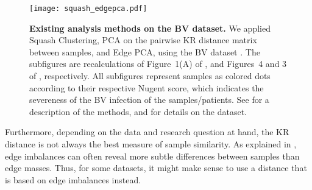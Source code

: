 \begin{figure}[!htb]
    \centering
    \texttt{[image: squash\_edgepca.pdf]}
    \begin{subfigure}{0pt}
        \label{fig:squash_edgepca:sub:squash}
    \end{subfigure}
    \begin{subfigure}{0pt}
        \label{fig:squash_edgepca:sub:pca}
    \end{subfigure}
    \begin{subfigure}{0pt}
        \label{fig:squash_edgepca:sub:epca}
    \end{subfigure}
    \caption[Existing analysis methods on the BV dataset]{
        \textbf{Existing analysis methods on the BV dataset.}
        We applied  Squash Clustering,
         PCA on the pairwise KR distance matrix between samples,
        and  Edge PCA,
        using the \acf{BV} dataset \cite{Srinivasan2012}.
        The subfigures are recalculations of Figure~1(A) of ,
        and Figures~4 and 3 of , respectively.
        All subfigures represent samples as colored dots according to their respective Nugent score,
        which indicates the severeness of the \ac{BV} infection of the samples/patients.
        See  for a description of the methods,
        and  for details on the dataset.
    }
    \label{fig:squash_edgepca}
\end{figure}

Furthermore, depending on the data and research question at hand,
the KR distance is not always the best measure of sample similarity.
As explained in ,
edge imbalances can often reveal more subtle differences between samples than edge masses.
Thus, for some datasets, it might make sense to use a distance that is based on edge imbalances instead.

